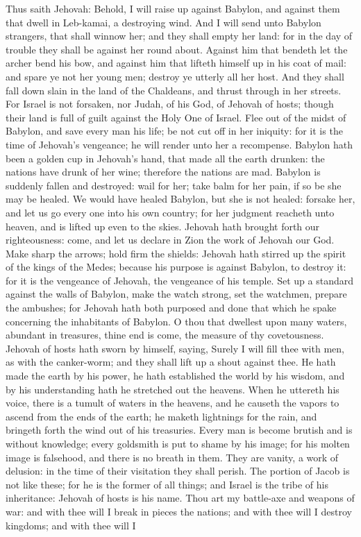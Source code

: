 Thus saith Jehovah: Behold, I will raise up against Babylon, and against them that dwell in Leb-kamai, a destroying wind. And I will send unto Babylon strangers, that shall winnow her; and they shall empty her land: for in the day of trouble they shall be against her round about. Against him that bendeth let the archer bend his bow, and against him that lifteth himself up in his coat of mail: and spare ye not her young men; destroy ye utterly all her host. And they shall fall down slain in the land of the Chaldeans, and thrust through in her streets.  For Israel is not forsaken, nor Judah, of his God, of Jehovah of hosts; though their land is full of guilt against the Holy One of Israel. Flee out of the midst of Babylon, and save every man his life; be not cut off in her iniquity: for it is the time of Jehovah’s vengeance; he will render unto her a recompense. Babylon hath been a golden cup in Jehovah’s hand, that made all the earth drunken: the nations have drunk of her wine; therefore the nations are mad. Babylon is suddenly fallen and destroyed: wail for her; take balm for her pain, if so be she may be healed. We would have healed Babylon, but she is not healed: forsake her, and let us go every one into his own country; for her judgment reacheth unto heaven, and is lifted up even to the skies. Jehovah hath brought forth our righteousness: come, and let us declare in Zion the work of Jehovah our God.  Make sharp the arrows; hold firm the shields: Jehovah hath stirred up the spirit of the kings of the Medes; because his purpose is against Babylon, to destroy it: for it is the vengeance of Jehovah, the vengeance of his temple. Set up a standard against the walls of Babylon, make the watch strong, set the watchmen, prepare the ambushes; for Jehovah hath both purposed and done that which he spake concerning the inhabitants of Babylon. O thou that dwellest upon many waters, abundant in treasures, thine end is come, the measure of thy covetousness. Jehovah of hosts hath sworn by himself, saying, Surely I will fill thee with men, as with the canker-worm; and they shall lift up a shout against thee.  He hath made the earth by his power, he hath established the world by his wisdom, and by his understanding hath he stretched out the heavens. When he uttereth his voice, there is a tumult of waters in the heavens, and he causeth the vapors to ascend from the ends of the earth; he maketh lightnings for the rain, and bringeth forth the wind out of his treasuries. Every man is become brutish and is without knowledge; every goldsmith is put to shame by his image; for his molten image is falsehood, and there is no breath in them. They are vanity, a work of delusion: in the time of their visitation they shall perish. The portion of Jacob is not like these; for he is the former of all things; and Israel is the tribe of his inheritance: Jehovah of hosts is his name.  Thou art my battle-axe and weapons of war: and with thee will I break in pieces the nations; and with thee will I destroy kingdoms; and with thee will I 